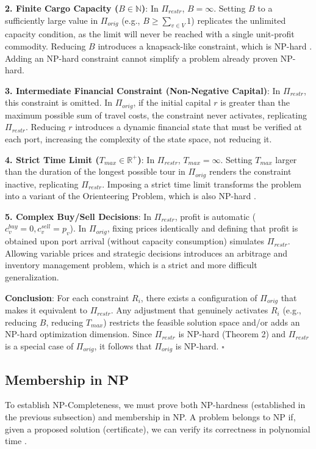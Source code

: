 \documentclass[12pt]{article}
\begin{document}
\textbf{2. Finite Cargo Capacity ($B \in \mathbb{N}$)}: In $\Pi_{restr}$, $B = \infty$. Setting $B$ to a sufficiently large value in $\Pi_{orig}$ (e.g., $B \geq \sum_{v \in V} 1$) replicates the unlimited capacity condition, as the limit will never be reached with a single unit-profit commodity. Reducing $B$ introduces a knapsack-like constraint, which is NP-hard \cite{karp1972}. Adding an NP-hard constraint cannot simplify a problem already proven NP-hard.

\textbf{3. Intermediate Financial Constraint (Non-Negative Capital)}: In $\Pi_{restr}$, this constraint is omitted. In $\Pi_{orig}$, if the initial capital $r$ is greater than the maximum possible sum of travel costs, the constraint never activates, replicating $\Pi_{restr}$. Reducing $r$ introduces a dynamic financial state that must be verified at each port, increasing the complexity of the state space, not reducing it.

\textbf{4. Strict Time Limit ($T_{max} \in \mathbb{R}^+$)}: In $\Pi_{restr}$, $T_{max} = \infty$. Setting $T_{max}$ larger than the duration of the longest possible tour in $\Pi_{orig}$ renders the constraint inactive, replicating $\Pi_{restr}$. Imposing a strict time limit transforms the problem into a variant of the Orienteering Problem, which is also NP-hard \cite{garey1979}.

\textbf{5. Complex Buy/Sell Decisions}: In $\Pi_{restr}$, profit is automatic ($c^{buy}_v = 0, c^{sell}_v = p_v$). In $\Pi_{orig}$, fixing prices identically and defining that profit is obtained upon port arrival (without capacity consumption) simulates $\Pi_{restr}$. Allowing variable prices and strategic decisions introduces an arbitrage and inventory management problem, which is a strict and more difficult generalization.

\textbf{Conclusion}: For each constraint $R_i$, there exists a configuration of $\Pi_{orig}$ that makes it equivalent to $\Pi_{restr}$. Any adjustment that genuinely activates $R_i$ (e.g., reducing $B$, reducing $T_{max}$) restricts the feasible solution space and/or adds an NP-hard optimization dimension. Since $\Pi_{restr}$ is NP-hard (Theorem 2) and $\Pi_{restr}$ is a special case of $\Pi_{orig}$, it follows that $\Pi_{orig}$ is NP-hard. \hfill $\square$

\subsection{Membership in NP}

To establish NP-Completeness, we must prove both NP-hardness (established in the previous subsection) and membership in NP. A problem belongs to NP if, given a proposed solution (certificate), we can verify its correctness in polynomial time \cite{garey1979}.
\end{document}
